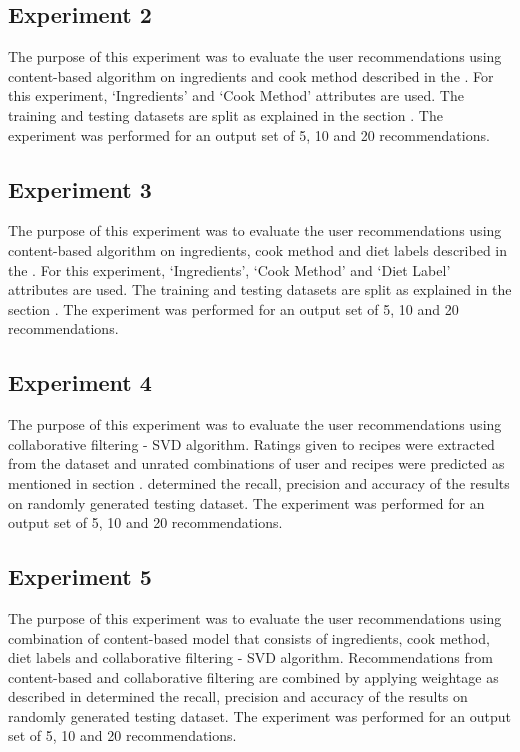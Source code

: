 \subsection{Experiment 2}
\label{sec:cb_ingred_cook_method_exp}
The purpose of this experiment was to evaluate the user recommendations using content-based algorithm on ingredients and cook method described in the . For this experiment, \lq{}Ingredients\rq{} and \lq{}Cook Method\rq{} attributes are used. The training and testing datasets are split as explained in the section . The experiment was performed for an output set of 5, 10 and 20 recommendations.

\subsection{Experiment 3}
\label{sec:cb_ingred_cook_method_diet_label_exp}
The purpose of this experiment was to evaluate the user recommendations using content-based algorithm on ingredients, cook method  and diet labels described in the . For this experiment, \lq{}Ingredients\rq{}, \lq{}Cook Method\rq{} and \lq{}Diet Label\rq{} attributes are used. The training and testing datasets are split as explained in the section . The experiment was performed for an output set of 5, 10 and 20 recommendations.

\subsection{Experiment 4}
\label{sec:cf_exp}
The purpose of this experiment was to evaluate the user recommendations using collaborative filtering - SVD algorithm. Ratings given to recipes were extracted from the dataset and unrated combinations of user and recipes were predicted as mentioned in section .  determined the recall, precision and accuracy of the results on randomly generated testing dataset. The experiment was performed for an output set of 5, 10 and 20 recommendations.

\subsection{Experiment 5}
\label{sec:hybrid_exp}
The purpose of this experiment was to evaluate the user recommendations using combination of content-based model that consists of ingredients, cook method, diet labels and collaborative filtering - SVD algorithm. Recommendations from content-based and collaborative filtering are combined by applying weightage as described in 
 determined the recall, precision and accuracy of the results on randomly generated testing dataset. The experiment was performed for an output set of 5, 10 and 20 recommendations.